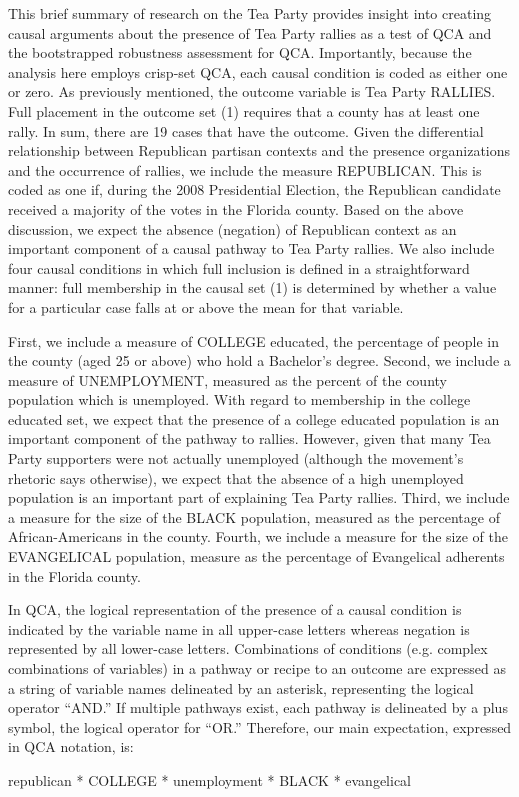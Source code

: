 \documentclass[12pt]{article}
\begin{document}
{This brief summary of research on the Tea Party provides insight into creating causal arguments about the presence of Tea Party rallies as a test of QCA and the bootstrapped robustness assessment for QCA. Importantly, because the analysis here employs crisp-set QCA, each causal condition is coded as either one or zero. As previously mentioned, the outcome variable is Tea Party RALLIES. Full placement in the outcome set (1) requires that a county has at least one rally. In sum, there are 19 cases that have the outcome. Given the differential relationship between Republican partisan contexts and the presence organizations and the occurrence of rallies, we include the measure REPUBLICAN. This is coded as one if, during the 2008 Presidential Election, the Republican candidate received a majority of the votes in the Florida county. Based on the above discussion, we expect the absence (negation) of Republican context as an important component of a causal pathway to Tea Party rallies. We also include four causal conditions in which full inclusion is defined in a straightforward manner: full membership in the causal set (1) is determined by whether a value for a particular case falls at or above the mean for that variable. 

First, we include a measure of COLLEGE educated, the percentage of people in the county (aged 25 or above) who hold a Bachelor's degree. Second, we include a measure of UNEMPLOYMENT, measured as the percent of the county population which is unemployed. With regard to membership in the college educated set, we expect that the presence of a college educated population is an important component of the pathway to rallies. However, given that many Tea Party supporters were not actually unemployed (although the movement's rhetoric says otherwise), we expect that the absence of a high unemployed population is an important part of explaining Tea Party rallies. Third, we include a measure for the size of the BLACK population, measured as the percentage of African-Americans in the county. Fourth, we include a measure for the size of the EVANGELICAL population, measure as the percentage of Evangelical adherents in the Florida county. 

In QCA, the logical representation of the presence of a causal condition is indicated by the variable name in all upper-case letters whereas negation is represented by all lower-case letters. Combinations of conditions (e.g. complex combinations of variables) in a pathway or recipe to an outcome are expressed as a string of variable names delineated by an asterisk, representing the logical operator ``AND.'' If multiple pathways exist, each pathway is delineated by a plus symbol, the logical operator for ``OR.'' Therefore, our main expectation, expressed in QCA notation, is:
\begin{center}
republican * COLLEGE * unemployment * BLACK * evangelical
\end{center}

}
\end{document}
